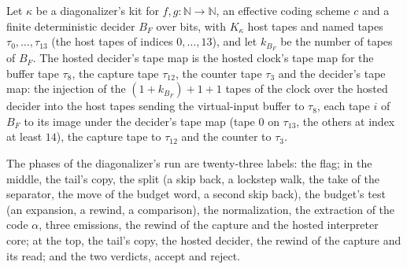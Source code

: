 \begin{definition}
\label{Turing.NTimeDiag.DzKit.sB}
\leanok
{}
Let $\kappa$ be a diagonalizer's kit for $f, g : \mathbb{N} \to \mathbb{N}$, an effective coding scheme $c$ and a finite deterministic decider $B_F$ over bits, with $K_\kappa$ host tapes and named tapes $\tau_0, \dots, \tau_{13}$ (the host tapes of indices $0, \dots, 13$), and let $k_{B_F}$ be the number of tapes of $B_F$. The hosted decider's tape map is the hosted clock's tape map for the buffer tape $\tau_8$, the capture tape $\tau_{12}$, the counter tape $\tau_3$ and the decider's tape map: the injection of the $(1 + k_{B_F}) + 1 + 1$ tapes of the clock over the hosted decider into the host tapes sending the virtual-input buffer to $\tau_8$, each tape $i$ of $B_F$ to its image under the decider's tape map (tape $0$ on $\tau_{13}$, the others at index at least $14$), the capture tape to $\tau_{12}$ and the counter to $\tau_3$.
\end{definition}

\begin{definition}
\label{Turing.NTimeDiag.DzQK}
\leanok
The phases of the diagonalizer's run are twenty-three labels: the flag; in the middle, the tail's copy, the split (a skip back, a lockstep walk, the take of the separator, the move of the budget word, a second skip back), the budget's test (an expansion, a rewind, a comparison), the normalization, the extraction of the code $\alpha$, three emissions, the rewind of the capture and the hosted interpreter core; at the top, the tail's copy, the hosted decider, the rewind of the capture and its read; and the two verdicts, accept and reject.
\end{definition}

